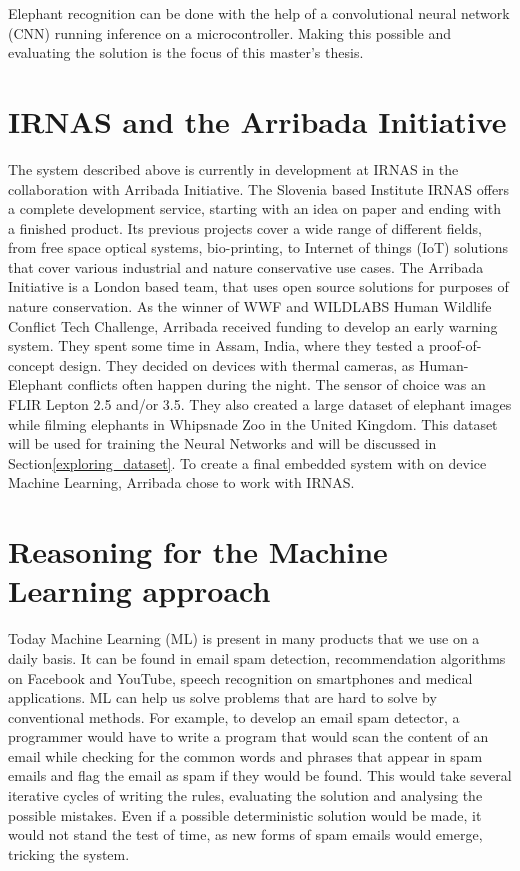 Elephant recognition can be done with the help of a convolutional neural network (CNN) running inference on a microcontroller. 
Making this possible and evaluating the solution is the focus of this master's thesis.


\section{ IRNAS and the Arribada Initiative}\label{arribada_init}

The system described above is currently in development at IRNAS in the collaboration with Arribada Initiative.
The Slovenia based Institute IRNAS offers a complete development service, starting with an idea on paper and ending with a finished product. 
Its previous projects cover a wide range of different fields, from free space optical systems, bio-printing, to Internet of things (IoT) solutions that cover various industrial and nature conservative use cases.
The Arribada Initiative is a London based team, that uses open source solutions for purposes of nature conservation.
As the winner of WWF and WILDLABS Human Wildlife Conflict Tech Challenge\cite{wildlabs-winners}, Arribada received funding to develop an early warning system.
They spent some time in Assam, India, where they tested a proof-of-concept design\cite{arribada-assam}.
They decided on devices with thermal cameras, as Human-Elephant conflicts often happen during the night.
The sensor of choice was an FLIR Lepton 2.5 and/or 3.5.
They also created a large dataset of elephant images while filming elephants in Whipsnade Zoo in the United Kingdom. 
This dataset will be used for training the Neural Networks and will be discussed in Section\ref{exploring_dataset}.
To create a final embedded system with on device Machine Learning, Arribada chose to work with IRNAS.


\section{ Reasoning for the Machine Learning approach}

Today Machine Learning (ML) is present in many products that we use on a daily basis.
It can be found in email spam detection, recommendation algorithms on Facebook and YouTube, speech recognition on smartphones and medical applications.
ML can help us solve problems that are hard to solve by conventional methods.
For example, to develop an email spam detector, a programmer would have to write a program that would scan the content of an email while checking for the common words and phrases that appear in spam emails and flag the email as spam if they would be found.
This would take several iterative cycles of writing the rules, evaluating the solution and analysing the possible mistakes. 
Even if a possible deterministic solution would be made, it would not stand the test of time, as new forms of spam emails would emerge, tricking the system.

